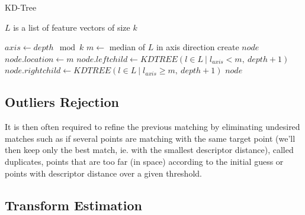     \begin{algorithm}
        \caption{KD-Tree}\label{alg:kdtree}
        \REQUIRE $L$ is a list of feature vectors of size $k$
        \begin{algorithmic}[1]
                \State $axis \longleftarrow depth \mod{k}$
                \State $m \longleftarrow $ median of $L$ in axis direction
                \State create $node$
                \State $node.location \longleftarrow m$
                \State $node.leftchild \longleftarrow KDTREE({l \in L \:\vert\; l_{axis} < m}, \:depth + 1)$
                \State $node.rightchild \longleftarrow KDTREE({l \in L \:\vert\; l_{axis} \geq m}, \:depth + 1)$
                \State \Return $node$
            \EndFunction
        \end{algorithmic}
    \end{algorithm}
    
    
\subsection{Outliers Rejection} 

    It is then often required to refine the previous matching by eliminating undesired matches such as if several points are matching with the same target point (we'll then keep only the best match, ie. with the smallest descriptor distance), called duplicates, points that are too far (in space) according to the initial guess or points with descriptor distance over a given threshold.
    
\subsection{Transform Estimation} 
    
